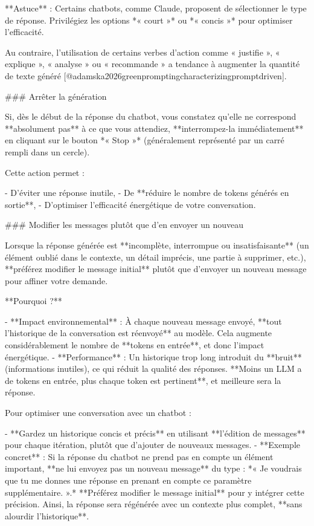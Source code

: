 **Astuce** : Certains chatbots, comme Claude, proposent de sélectionner le type de réponse. Privilégiez les options *« court »* ou *« concis »* pour optimiser l'efficacité.

Au contraire, l'utilisation de certains verbes d'action comme « justifie », « explique », « analyse » ou « recommande » a tendance à augmenter la quantité de texte généré [@adamska2026greenpromptingcharacterizingpromptdriven].

### Arrêter la génération

Si, dès le début de la réponse du chatbot, vous constatez qu'elle ne correspond **absolument pas** à ce que vous attendiez, **interrompez-la immédiatement** en cliquant sur le bouton *« Stop »* (généralement représenté par un carré rempli dans un cercle).

Cette action permet :

- D'éviter une réponse inutile,
- De **réduire le nombre de tokens générés en sortie**,
- D'optimiser l'efficacité énergétique de votre conversation.

### Modifier les messages plutôt que d'en envoyer un nouveau

Lorsque la réponse générée est **incomplète, interrompue ou insatisfaisante** (un élément oublié dans le contexte, un détail imprécis, une partie à supprimer, etc.), **préférez modifier le message initial** plutôt que d'envoyer un nouveau message pour affiner votre demande.

**Pourquoi ?**

- **Impact environnemental** : À chaque nouveau message envoyé, **tout l'historique de la conversation est réenvoyé** au modèle. Cela augmente considérablement le nombre de **tokens en entrée**, et donc l'impact énergétique.
- **Performance** : Un historique trop long introduit du **bruit** (informations inutiles), ce qui réduit la qualité des réponses. **Moins un LLM a de tokens en entrée, plus chaque token est pertinent**, et meilleure sera la réponse.

Pour optimiser une conversation avec un chatbot :

- **Gardez un historique concis et précis** en utilisant **l'édition de messages** pour chaque itération, plutôt que d'ajouter de nouveaux messages.
- **Exemple concret** :
  Si la réponse du chatbot ne prend pas en compte un élément important, **ne lui envoyez pas un nouveau message** du type :
  *« Je voudrais que tu me donnes une réponse en prenant en compte ce paramètre supplémentaire. ».* **Préférez modifier le message initial** pour y intégrer cette précision. Ainsi, la réponse sera régénérée avec un contexte plus complet, **sans alourdir l'historique**.

